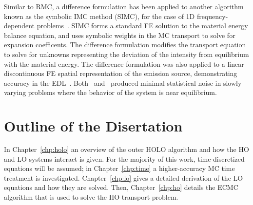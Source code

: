Similar to RMC, a difference formulation has been applied to another algorithm known as the symbolic IMC method
(SIMC), for the case of 1D frequency-dependent problems~\cite{simc_const}.  SIMC forms a
standard FE solution to the material energy balance equation, and uses symbolic
weights in the MC transport to solve for expansion coefficents.  The difference
formulation modifies the transport equation to solve for unknowns representing the
deviation of the intensity from
equilibrium with the material energy.  The difference
formulation was also applied to a linear-discontinuous FE spatial
representation of the emission source, demonstrating accuracy in the EDL~\cite{simc}. 
Both~\cite{simc_const} and~\cite{rmc} produced minimal
statistical noise in slowly varying problems where the behavior of the system is near
equilibrium. 


\section{Outline of the Disertation}

In Chapter~\ref{chp:holo} an overview of the outer HOLO algorithm and how the HO and LO
systems interact is given.  For the majority of this work, time-discretized equations will
be assumed; in Chapter~\ref{chp:time} a higher-accuracy MC time treatment is investigated. Chapter~\ref{chp:lo} gives a detailed derivation of the LO
equations and how they are solved.  Then, Chapter~\ref{chp:ho} details the ECMC algorithm
that is used to solve the HO transport problem.

